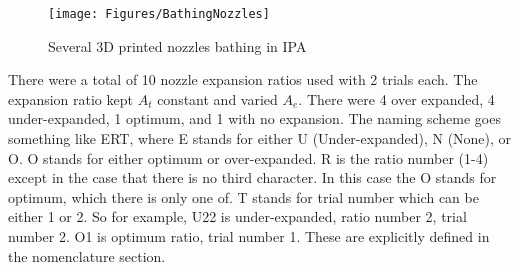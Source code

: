 \begin{figure}[h!]
\centering
\texttt{[image: Figures/BathingNozzles]}
\caption{Several 3D printed nozzles bathing in IPA}
\label{fig:BathingNozzles}
\end{figure}
There were a total of 10 nozzle expansion ratios used with 2 trials each. The expansion ratio kept $A_t$ constant and varied $A_e$. There were 4 over expanded, 4 under-expanded, 1 optimum, and 1 with no expansion. The naming scheme goes something like ERT, where E stands for either U (Under-expanded), N (None), or O. O stands for either optimum or over-expanded. R is the ratio number (1-4) except in the case that there is no third character. In this case the O stands for optimum, which there is only one of. T stands for trial number which can be either 1 or 2. So for example, U22 is under-expanded, ratio number 2, trial number 2. O1 is optimum ratio, trial number 1. These are explicitly defined in the nomenclature section.%
%
%
%
%
%
%
%
%
%
%
%
%
%
%
%
%
%
%
%
